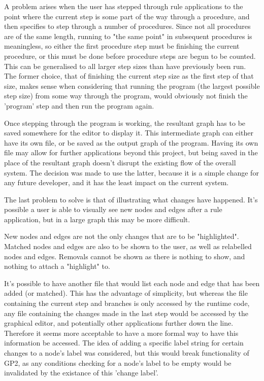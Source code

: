 \documentclass{UoYCSproject}
\begin{document}
A problem arises when the user has stepped through rule applications to the point where the current step is some part of the way through a procedure, and then specifies to step through a number of procedures. Since not all procedures are of the same length, running to "the same point" in subsequent procedures is meaningless, so either the first procedure step must be finishing the current procedure, or this must be done before procedure steps are begun to be counted. This can be generalised to all larger step sizes than have previously been run. The former choice, that of finishing the current step size as the first step of that size, makes sense when considering that running the program (the largest possible step size) from some way through the program, would obviously not finish the 'program' step and then run the program again.

Once stepping through the program is working, the resultant graph has to be saved somewhere for the editor to display it. This intermediate graph can either have its own file, or be saved as the output graph of the program. Having its own file may allow for further applications beyond this project, but being saved in the place of the resultant graph doesn't disrupt the existing flow of the overall system. The decision was made to use the latter, because it is a simple change for any future developer, and it has the least impact on the current system.

The last problem to solve is that of illustrating what changes have happened. It's possible a user is able to visually see new nodes and edges after a rule application, but in a large graph this may be more difficult. 

New nodes and edges are not the only changes that are to be "highlighted". Matched nodes and edges are also to be shown to the user, as well as relabelled nodes and edges. Removals cannot be shown as there is nothing to show, and nothing to attach a "highlight" to.

It's possible to have another file that would list each node and edge that has been added (or matched). This has the advantage of simplicity, but whereas the file containing the current step and branches is only accessed by the runtime code, any file containing the changes made in the last step would be accessed by the graphical editor, and potentially other applications further down the line. Therefore it seems more acceptable to have a more formal way to have this information be accessed. The idea of adding a specific label string for certain changes to a node's label was considered, but this would break functionality of GP2, as any conditions checking for a node's label to be empty would be invalidated by the existance of this 'change label'.
\end{document}
